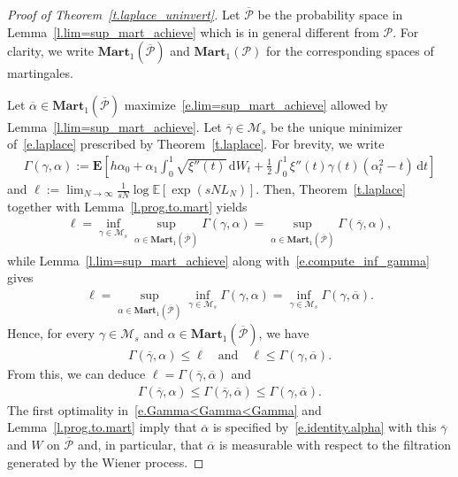 \documentclass[11pt]{amsart}
\theoremstyle{remark}
\theoremstyle{definition}
\numberwithin{equation}{section}
\numberwithin{proposition}{section}
\numberwithin{figure}{section}
\numberwithin{table}{section}
\newcommand{\E}{\mathbb{E}}
\newcommand{\EE}{\mathbf{E}}
\renewcommand{\leq}{\leqslant}
\renewcommand{\bar}{\overline}
\newcommand{\Ll}{\left}
\newcommand{\Rr}{\right}
\renewcommand{\d}{\mathrm{d}}
\newcommand{\1}{\mathbf{1}}
\newcommand{\mcl}{\mathcal}
\newcommand{\msc}{\mathscr}
\newcommand{\al}{\alpha}
\newcommand{\ga}{\gamma}
\newcommand{\bmart}{\mathbf{Mart}}
\newcommand{\cM}{\mathcal{M}}
\begin{document}
\begin{proof}[Proof of Theorem~\ref{t.laplace_uninvert}]
Let $\bar{\msc P}$ be the probability space in Lemma~\ref{l.lim=sup_mart_achieve} which is in general different from $\msc P$. For clarity, we write $\bmart_1(\bar{\msc P})$ and $\bmart_1 (\msc P)$ for the corresponding spaces of martingales. 

Let $\bar\alpha\in \bmart_1(\bar{\msc P})$ maximize~\eqref{e.lim=sup_mart_achieve} allowed by Lemma~\ref{l.lim=sup_mart_achieve}. Let $\bar\gamma\in \cM_s$ be the unique minimizer of~\eqref{e.laplace} prescribed by Theorem~\ref{t.laplace}. 
For brevity, we write 
\begin{align*}%
    \Gamma(\gamma,\alpha):=\EE \Ll[ h \al_0 + \al_1 \int_0^1 \sqrt{\xi''(t)}\, \d W_t + \frac{1}{2}\int_{0}^{1}\xi''(t)\ga(t) \Ll(\alpha^{2}_t-t\Rr)\, \d t \Rr] 
\end{align*}
and
$\ell := \lim_{N\to\infty} \frac{1}{sN}\log\E \Ll[\exp(sNL_N)\Rr]$. Then, Theorem~\ref{t.laplace} together with Lemma~\ref{l.prog.to.mart} yields
\begin{align*}
    \ell = \inf_{\gamma\in\cM_s}\sup_{\alpha\in\bmart_1(\bar{\msc P})}\Gamma(\gamma,\alpha) = \sup_{\alpha\in\bmart_1(\bar{\msc P})}\Gamma(\bar\gamma,\alpha),
\end{align*}
while Lemma~\ref{l.lim=sup_mart_achieve} along with~\eqref{e.compute_inf_gamma} gives
\begin{align*}
    \ell = \sup_{\alpha\in\bmart_1(\bar{\msc P})}\inf_{\gamma\in\cM_s}\Gamma(\gamma,\alpha) = \inf_{\gamma\in\cM_s}\Gamma(\gamma,\bar\alpha).
\end{align*}
Hence, for every $\gamma \in\mcl M_s$ and $\alpha\in\bmart_1(\bar{\msc P})$, we have
\begin{align*}
    \Gamma(\bar\gamma,\alpha)\leq \ell \quad \text{and}\quad \ell \leq \Gamma(\gamma,\bar\alpha).
\end{align*}
From this, we can deduce $\ell= \Gamma(\bar\gamma,\bar\alpha)$ and
\begin{align}\label{e.Gamma<Gamma<Gamma}
    \Gamma(\bar\gamma,\alpha)\leq \Gamma(\bar\gamma,\bar\alpha)\leq \Gamma(\gamma,\bar\alpha).
\end{align}
The first optimality in~\eqref{e.Gamma<Gamma<Gamma} and Lemma~\ref{l.prog.to.mart} imply that $\bar\alpha$ is specified by~\eqref{e.identity.alpha} with this $\bar\gamma$ and $W$ on $\bar{\msc P}$ and, in particular, that $\bar\alpha$ is measurable with respect to the filtration generated by the Wiener process.


\end{proof}
\end{document}
